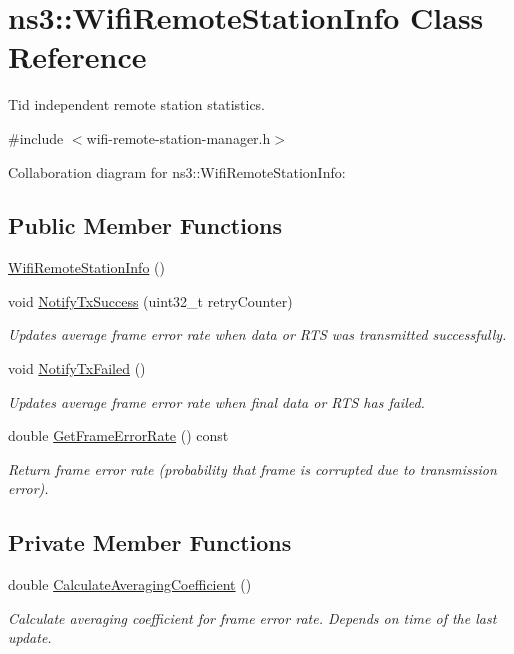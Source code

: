 \hypertarget{classns3_1_1WifiRemoteStationInfo}{}\section{ns3\+:\+:Wifi\+Remote\+Station\+Info Class Reference}
\label{classns3_1_1WifiRemoteStationInfo}


Tid independent remote station statistics.  




{\ttfamily \#include $<$wifi-\/remote-\/station-\/manager.\+h$>$}



Collaboration diagram for ns3\+:\+:Wifi\+Remote\+Station\+Info\+:
\subsection*{Public Member Functions}
\begin{DoxyCompactItemize}
\item 
\hyperlink{classns3_1_1WifiRemoteStationInfo_a2fba9ce0ea2e01186260049b9a417d69}{Wifi\+Remote\+Station\+Info} ()
\item 
void \hyperlink{classns3_1_1WifiRemoteStationInfo_aa3998de7bb103069d52cd9f7c6fa5017}{Notify\+Tx\+Success} (uint32\+\_\+t retry\+Counter)
\begin{DoxyCompactList}\small\item\em Updates average frame error rate when data or R\+TS was transmitted successfully. \end{DoxyCompactList}\item 
void \hyperlink{classns3_1_1WifiRemoteStationInfo_ade8b3dfb4424924c828c7aad0d56a849}{Notify\+Tx\+Failed} ()
\begin{DoxyCompactList}\small\item\em Updates average frame error rate when final data or R\+TS has failed. \end{DoxyCompactList}\item 
double \hyperlink{classns3_1_1WifiRemoteStationInfo_a54533d128f6f296e343e96afc77eb916}{Get\+Frame\+Error\+Rate} () const 
\begin{DoxyCompactList}\small\item\em Return frame error rate (probability that frame is corrupted due to transmission error). \end{DoxyCompactList}\end{DoxyCompactItemize}
\subsection*{Private Member Functions}
\begin{DoxyCompactItemize}
\item 
double \hyperlink{classns3_1_1WifiRemoteStationInfo_a7a01e2ac68e10d19c323b875b8155c48}{Calculate\+Averaging\+Coefficient} ()
\begin{DoxyCompactList}\small\item\em Calculate averaging coefficient for frame error rate. Depends on time of the last update. \end{DoxyCompactList}\end{DoxyCompactItemize}
